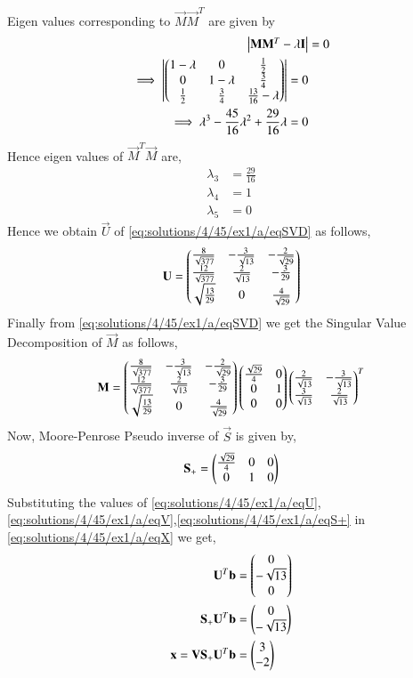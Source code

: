 Eigen values corresponding to $\vec{M}\Vec{M}^T$ are given by
\begin{align}
\begin{vmatrix}\mathbf{M}\mathbf{M}^T-\lambda\mathbf{I}\end{vmatrix} &= 0\\
\implies \begin{vmatrix}\begin{pmatrix}1-\lambda&0&\frac{1}{2}\\0&1-\lambda&\frac{3}{4}\\\frac{1}{2}&\frac{3}{4}&\frac{13}{16}-\lambda\end{pmatrix}\end{vmatrix}=0\\
\implies \lambda^3-\frac{45}{16}\lambda^2+\frac{29}{16}\lambda=0
\end{align}
Hence eigen values of $\vec{M}^T\vec{M}$ are,
\begin{align}
\lambda_3 &=\frac{29}{16}\\
\lambda_4 &= 1\\
\lambda_5 &= 0
\end{align}
Hence we obtain $\vec{U}$ of \eqref{eq:solutions/4/45/ex1/a/eqSVD} as follows,
\begin{align}
\mathbf{U}=\label{eq:solutions/4/45/ex1/a/eqU}\begin{pmatrix}\frac{8}{\sqrt{377}}&-\frac{3}{\sqrt{13}}&-\frac{2}{\sqrt{29}}\\\frac{12}{\sqrt{377}}&\frac{2}{\sqrt{13}}&-\frac{3}{29}\\\sqrt{\frac{13}{29}}&0&\frac{4}{\sqrt{29}}\end{pmatrix}
\end{align}
Finally from \eqref{eq:solutions/4/45/ex1/a/eqSVD} we get the Singular Value Decomposition of $\vec{M}$ as follows,
\begin{align}
\mathbf{M} = \begin{pmatrix}\frac{8}{\sqrt{377}}&-\frac{3}{\sqrt{13}}&-\frac{2}{\sqrt{29}}\\\frac{12}{\sqrt{377}}&\frac{2}{\sqrt{13}}&-\frac{3}{29}\\\sqrt{\frac{13}{29}}&0&\frac{4}{\sqrt{29}}\end{pmatrix}\begin{pmatrix}\frac{\sqrt{29}}{4}&0\\0&1\\0&0\end{pmatrix}\begin{pmatrix}\frac{2}{\sqrt{13}}&-\frac{3}{\sqrt{13}}\\ \frac{3}{\sqrt{13}}&\frac{2}{\sqrt{13}}\end{pmatrix}^T
\end{align}
Now, Moore-Penrose Pseudo inverse of $\vec{S}$ is given by,
\begin{align}
\mathbf{S_+} = \begin{pmatrix}\frac{\sqrt{29}}{4}&0&0\\0&1&0\end{pmatrix}\label{eq:solutions/4/45/ex1/a/eqS+}
\end{align}
Substituting the values of \eqref{eq:solutions/4/45/ex1/a/eqU},\eqref{eq:solutions/4/45/ex1/a/eqV},\eqref{eq:solutions/4/45/ex1/a/eqS+} in \eqref{eq:solutions/4/45/ex1/a/eqX}  we get,
\begin{align}
\mathbf{U}^T\mathbf{b}&=\begin{pmatrix}0\\-\sqrt{13}\\0\end{pmatrix}\\
\mathbf{S_+}\mathbf{U}^T\mathbf{b}&=\begin{pmatrix}0\\-\sqrt{13}\end{pmatrix}\\
\mathbf{x} = \mathbf{V}\mathbf{S_+}\mathbf{U}^T\mathbf{b} &= \begin{pmatrix}3\\-2\end{pmatrix}\label{eq:solutions/4/45/ex1/a/eqXSol1}
\end{align}
